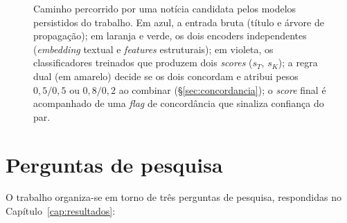 \begin{figure}[H]
\caption{Caminho percorrido por uma not\'icia candidata pelos modelos
persistidos do trabalho. Em azul, a entrada bruta (t\'itulo e \'arvore
de propaga\c{c}\~ao); em laranja e verde, os dois encoders
independentes (\emph{embedding} textual e \emph{features}
estruturais); em violeta, os classificadores treinados que produzem
dois \emph{scores} ($s_{T}$, $s_{K}$); a regra dual (em amarelo)
decide se os dois concordam e atribui pesos $0{,}5/0{,}5$ ou
$0{,}8/0{,}2$ ao combinar (\S\ref{sec:concordancia}); o \emph{score}
final \'e acompanhado de uma \emph{flag} de concord\^ancia que
sinaliza confian\c{c}a do par.}
\label{fig:user_journey}
\end{figure}

\section{Perguntas de pesquisa}
\label{sec:rqs}

O trabalho organiza-se em torno de tr\^es perguntas de pesquisa,
respondidas no Cap\'itulo~\ref{cap:resultados}:

